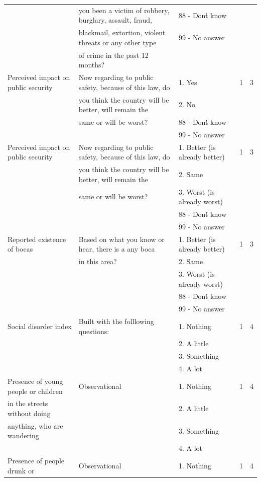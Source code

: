 \documentclass[11pt]{article}
\begin{document}
\begin{landscape}
\begin{tiny}
\begin{tabular}{lllcc}
	&	you been a victim of robbery, burglary, assault, fraud,	&	88 - Don\'t know	&		&			\\
	&	blackmail, extortion, violent threats or any other type	&	99 - No answer	&		&			\\
	&	of crime in the past 12 months?	&		&		&			\\\hline
Perceived impact on public security	&	Now regarding to public safety, because of this law, do	&	1. Yes	&	1	&	3		\\
	&	you think the country will be better, will remain the	&	2. No 	&		&			\\
	&	same or will be worst?	&	88 - Don\'t know	&		&			\\
	&		&	99 - No answer	&		&			\\\hline
Perceived impact on public security	&	Now regarding to public safety, because of this law, do	&	1. Better (is already better)	&	1	&	3		\\
	&	you think the country will be better, will remain the	&	2. Same	&		&			\\
	&	same or will be worst?	&	3.  Worst (is already worst)	&		&			\\
	&		&	88 - Don\'t know	&		&			\\
	&		&	99 - No answer	&		&			\\\hline
Reported existence of bocas	&	Based on what you know or hear, there is a any boca	&	1. Better (is already better)	&	1	&	3		\\
	&	in this area?	&	2. Same	&		&			\\
	&		&	3.  Worst (is already worst)	&		&			\\
	&		&	88 - Don\'t know	&		&			\\
	&		&	99 - No answer	&		&			\\\hline
Social disorder index	&	Built with the folllowing questions:	&	1. Nothing	&	1	&	4		\\
	&		&	2. A little	&		&			\\
	&		&	3. Something	&		&			\\
	&		&	4. A lot	&		&			\\
Presence of young people or children 	&	Observational	&	1. Nothing	&	1	&	4		\\
in the streets without doing	&		&	2. A little	&		&			\\
 anything, who are wandering	&		&	3. Something	&		&			\\
	&		&	4. A lot	&		&			\\
Presence of   people drunk or 	&	Observational	&	1. Nothing	&	1	&	4		\\

\end{tabular}
\end{tiny}
\end{landscape}
\end{document}
